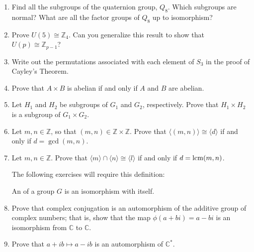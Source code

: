 {\begin{enumerate}[(1)]
\item
Find all the subgroups of the quaternion group, $Q_8$. Which subgroups
are normal? What are all the factor groups of $Q_8$ up to isomorphism?


 

 \item
Prove $U(5) \cong {\mathbb Z}_4$. Can you generalize this result to show
that $U(p) \cong {\mathbb Z}_{p-1}$? 
 

\item
Write out the permutations associated with each element of $S_3$ in
the proof of Cayley's Theorem. 


\item
Prove that $A \times B$ is abelian if and only if $A$ and $B$ are
abelian. 
 

 

\item
Let $H_1$ and $H_2$ be subgroups of $G_1$ and $G_2$, respectively. Prove that $H_1 \times H_2$ is a subgroup of $G_1 \times G_2$. 
 

\item
Let $m, n \in {\mathbb Z}$, so that $(m,n) \in \mathbb{Z} \times \mathbb{Z}$. Prove that $\langle (m,n) \rangle \cong \langle d \rangle$ if and only if $d = \gcd(m,n)$.
 

\item
Let $m, n \in {\mathbb Z}$. Prove that $\langle m \rangle \cap \langle n \rangle \cong \langle l \rangle$ if and only if $d = \operatorname{lcm}(m,n)$. 

 \bigskip

\bigskip
 

\noindent
The following exercises  will require this definition:

\begin{defn}
 An  of a group $G$ is an isomorphism
with itself. 
\end{defn}

\item
Prove that complex conjugation is an automorphism of the
additive group of complex numbers; that is, show that the map $\phi(
a + bi ) = a - bi$ is an isomorphism from ${\mathbb C}$ to ${\mathbb C}$. 
 

\item
Prove that $a + ib \mapsto a - ib$ is an automorphism of ${\mathbb C}^*$. 
 


\end{enumerate}}
